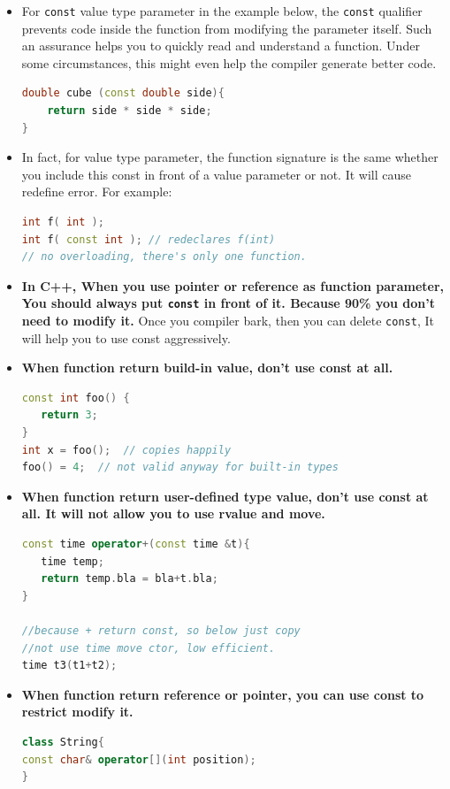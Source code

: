 \documentclass[a4paper,12pt,twoside]{book}
\begin{document}
\begin{itemize}
\item For \texttt{const} value type parameter in the example below, the \texttt{const} qualifier prevents code inside the function from modifying the parameter itself. Such an assurance helps you to quickly read and understand a function. Under some circumstances, this might even help the compiler generate better code. 
\begin{lstlisting}[frame=single, language=c++]
double cube (const double side){
    return side * side * side;
}
\end{lstlisting}

\item In fact, for value type parameter, the function signature is the same whether you include this const in front of a value parameter or not. It will cause redefine error. For example:
\begin{lstlisting}[frame=single, language=c++]
int f( int );
int f( const int ); // redeclares f(int)
// no overloading, there's only one function.
\end{lstlisting}

\item \textbf{In C++, When you use pointer or reference as function parameter, You should always put \texttt{const} in front of it. Because 90\% you don't need to modify it. } Once you compiler bark, then you can delete \texttt{const}, It will help you to use const aggressively.

\item \textbf{When function return build-in value, don't use const at all. }
\begin{lstlisting}[frame=single, language=c++]
const int foo() {
   return 3;
}
int x = foo();  // copies happily
foo() = 4;  // not valid anyway for built-in types
\end{lstlisting}

\item \textbf{When function return user-defined type value, don't use const at all. It will not allow you to use rvalue and move. }
\begin{lstlisting}[frame=single, language=c++]
const time operator+(const time &t){
   time temp;
   return temp.bla = bla+t.bla;
}

//because + return const, so below just copy
//not use time move ctor, low efficient.
time t3(t1+t2);
\end{lstlisting}

\item \textbf{When function return reference or pointer, you can use const to restrict modify it.}
\begin{lstlisting}[frame=single, language=c++]
class String{
const char& operator[](int position);
}
\end{lstlisting}


\end{itemize}
\end{document}

